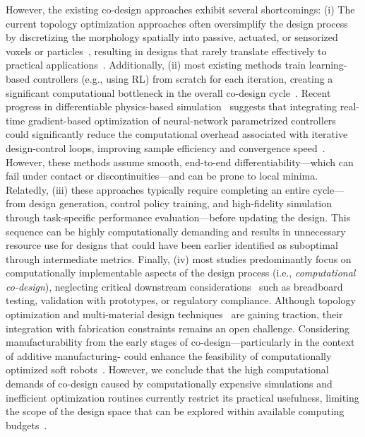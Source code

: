 However, the existing co-design approaches exhibit several shortcomings:
(i) The current topology optimization approaches often oversimplify the design process by discretizing the morphology spatially into passive, actuated, or sensorized voxels or particles~\citep{spielberg2019learning, medvet2021biodiversity, medvet2022impact, wang2022curriculum, legrand2023reconfigurable, wang2023softzoo, wang2023preco, wang2024diffusebot}, resulting in designs that rarely translate effectively to practical applications~\citep{legrand2023reconfigurable, wang2024diffusebot}. Additionally, (ii) most existing methods train learning-based controllers (e.g., using \gls{RL}) from scratch for each iteration, creating a significant computational bottleneck in the overall co-design cycle~\citep{bhatia2021evolution, wang2022curriculum, wang2023preco}. Recent progress in differentiable physics-based simulation~\citep{coevoet2017software, hu2019chainqueen, fang2020kinematics} suggests that integrating real-time gradient-based optimization of neural-network parametrized controllers could significantly reduce the computational overhead associated with iterative design-control loops, improving sample efficiency and convergence speed~\citep{spielberg2019learning, wang2024diffusebot}. However, these methods assume smooth, end-to-end differentiability—which can fail under contact or discontinuities—and can be prone to local minima. 
Relatedly, (iii) these approaches typically require completing an entire cycle—from design generation, control policy training, and high-fidelity simulation through task-specific performance evaluation—before updating the design. This sequence can be highly computationally demanding and results in unnecessary resource use for designs that could have been earlier identified as suboptimal through intermediate metrics. 
Finally, (iv) most studies predominantly focus on computationally implementable aspects of the design process (i.e., \emph{computational co-design}), neglecting critical downstream considerations~\citep{junge2022leveraging} such as breadboard testing, validation with prototypes, or regulatory compliance. Although topology optimization and multi-material design techniques~\citep{chen2020design} are gaining traction, their integration with fabrication constraints remains an open challenge. Considering manufacturability from the early stages of co-design—particularly in the context of additive manufacturing- could enhance the feasibility of computationally optimized soft robots~\citep{navez2024contributions}.
However, we conclude that the high computational demands of co-design caused by computationally expensive simulations and inefficient optimization routines currently restrict its practical usefulness, limiting the scope of the design space that can be explored within available computing budgets~\citep{chen2020design}.